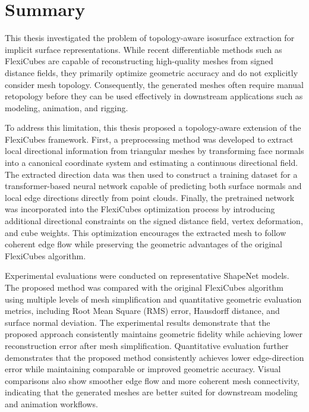 \documentclass[../main.tex]{subfiles}
\begin{document}
\section{Summary}

This thesis investigated the problem of topology-aware isosurface extraction for implicit surface representations. While recent differentiable methods such as FlexiCubes are capable of reconstructing high-quality meshes from signed distance fields, they primarily optimize geometric accuracy and do not explicitly consider mesh topology. Consequently, the generated meshes often require manual retopology before they can be used effectively in downstream applications such as modeling, animation, and rigging.

To address this limitation, this thesis proposed a topology-aware extension of the FlexiCubes framework. First, a preprocessing method was developed to extract local directional information from triangular meshes by transforming face normals into a canonical coordinate system and estimating a continuous directional field. The extracted direction data was then used to construct a training dataset for a transformer-based neural network capable of predicting both surface normals and local edge directions directly from point clouds. Finally, the pretrained network was incorporated into the FlexiCubes optimization process by introducing additional directional constraints on the signed distance field, vertex deformation, and cube weights. This optimization encourages the extracted mesh to follow coherent edge flow while preserving the geometric advantages of the original FlexiCubes algorithm.

Experimental evaluations were conducted on representative ShapeNet models. The proposed method was compared with the original FlexiCubes algorithm using multiple levels of mesh simplification and quantitative geometric evaluation metrics, including Root Mean Square (RMS) error, Hausdorff distance, and surface normal deviation. The experimental results demonstrate that the proposed approach consistently maintains geometric fidelity while achieving lower reconstruction error after mesh simplification. Quantitative evaluation further demonstrates that the proposed method consistently achieves lower edge-direction error while maintaining comparable or improved geometric accuracy. Visual comparisons also show smoother edge flow and more coherent mesh connectivity, indicating that the generated meshes are better suited for downstream modeling and animation workflows.
\end{document}
